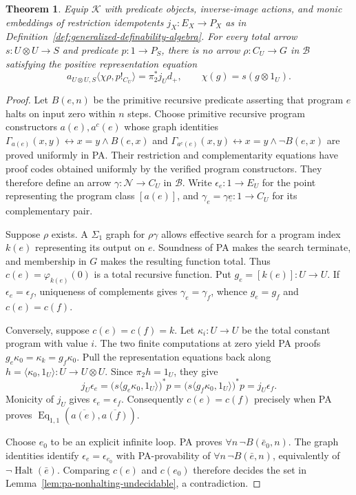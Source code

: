 \documentclass[11pt]{article}
\newtheorem{theorem}{Theorem}[section]
\theoremstyle{definition}
\theoremstyle{remark}
\begin{document}
\begin{theorem}\label{thm:pa-no-internal-representation}
Equip $\mathcal K$ with predicate objects, inverse-image actions,
and monic embeddings of restriction idempotents $j_X:E_X\to P_X$ as in
Definition~\ref{def:generalized-definability-algebra}.
For every total arrow $s:U\otimes U\to S$ and predicate
$p:1\to P_S$, there is no arrow $\rho:C_U\to G$ in
$\mathcal B$ satisfying the positive representation equation
\[
 a_{U\otimes U,S}
   \langle\chi\rho,p!_{C_U}\rangle
      =\pi_2^*j_Ud_+,
 \qquad \chi(g)=s(g\otimes1_U).
\]
\end{theorem}
\begin{proof}
Let $B(e,n)$ be the primitive recursive predicate asserting that
program $e$ halts on input zero within $n$ steps.
Choose primitive recursive program constructors $a(e),a^c(e)$
whose graph identities
$\Gamma_{a(e)}(x,y)\leftrightarrow x=y\wedge B(e,x)$ and
$\Gamma_{a^c(e)}(x,y)\leftrightarrow x=y\wedge\neg B(e,x)$
are proved uniformly in PA. Their restriction and complementarity
equations have proof codes obtained uniformly by the verified
program constructors. They therefore define an arrow
$\gamma:\mathcal N\to C_U$ in $\mathcal B$.
Write $\epsilon_e:1\to E_U$ for the point representing the
program class $[a(e)]$, and
$\gamma_e=\gamma\underline e:1\to C_U$ for its complementary pair.

Suppose $\rho$ exists. A $\Sigma_1$ graph for $\rho\gamma$
allows effective search for a program index $k(e)$ representing
its output on $e$. Soundness of PA makes the search terminate,
and membership in $G$ makes the resulting function total.
Thus $c(e)=\varphi_{k(e)}(0)$ is a total recursive function.
Put $g_e=[k(e)]:U\to U$.
If $\epsilon_e=\epsilon_f$, uniqueness of complements gives
$\gamma_e=\gamma_f$, whence $g_e=g_f$ and $c(e)=c(f)$.

Conversely, suppose $c(e)=c(f)=k$. Let
$\kappa_i:U\to U$ be the total constant program with value $i$.
The two finite computations at zero yield PA proofs
$g_e\kappa_0=\kappa_k=g_f\kappa_0$.
Pull the representation equations back along
$h=\langle\kappa_0,1_U\rangle:U\to U\otimes U$.
Since $\pi_2h=1_U$, they give
\[
 j_U\epsilon_e
 =\bigl(s\langle g_e\kappa_0,1_U\rangle\bigr)^*p
 =\bigl(s\langle g_f\kappa_0,1_U\rangle\bigr)^*p
 =j_U\epsilon_f.
\]
Monicity of $j_U$ gives $\epsilon_e=\epsilon_f$.
Consequently $c(e)=c(f)$ precisely when PA proves
$\operatorname{Eq}_{1,1}(\overline{a(e)},\overline{a(f)})$.

Choose $e_0$ to be an explicit infinite loop. PA proves
$\forall n\,\neg B(\bar e_0,n)$.
The graph identities identify $\epsilon_e=\epsilon_{e_0}$ with
PA-provability of $\forall n\,\neg B(\bar e,n)$, equivalently
of $\neg\operatorname{Halt}(\bar e)$.
Comparing $c(e)$ and $c(e_0)$ therefore decides the set in
Lemma~\ref{lem:pa-nonhalting-undecidable}, a contradiction.
\end{proof}
\end{document}
